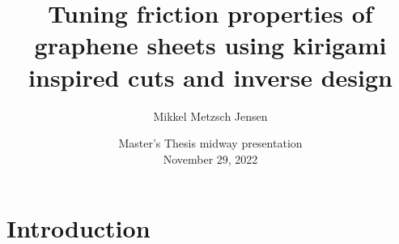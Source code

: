 \documentclass[
	10pt, %
]{beamer}
\title[Short Title]{Tuning friction properties of graphene sheets using kirigami inspired cuts and inverse design} %
\author[Mikkel Metzsch Jensen]{Mikkel Metzsch Jensen} %
\institute[UiO]{Universitetet i Oslo} %
\date[\today]{Master's Thesis midway presentation \\ November 29, 2022} %
\begin{document}

\begin{frame}
	\titlepage %
\end{frame}



	



\section{Introduction}
\end{document}

